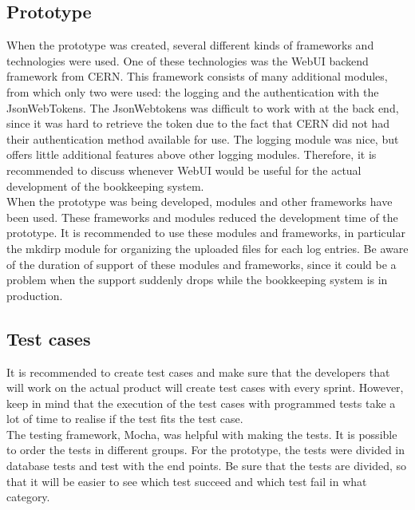 \documentclass[paper=a4, fontsize=11pt,twoside]{scrartcl}	%
\begin{document}
\subsection{Prototype}
When the prototype was created, several different kinds of frameworks and technologies were used. One of these technologies was the WebUI backend framework from CERN. This framework consists of many additional modules, from which only two were used: the logging and the authentication with the JsonWebTokens. The JsonWebtokens was difficult to work with at the back end, since it was hard to retrieve the token due to the fact that CERN did not had their authentication method available for use. The logging module was nice, but offers little additional features above other logging modules. Therefore, it is recommended to discuss whenever WebUI would be useful for the actual development of the bookkeeping system. \\
When the prototype was being developed, modules and other frameworks have been used. These frameworks and modules reduced the development time of the prototype. It is recommended to use these modules and frameworks, in particular the mkdirp module for organizing the uploaded files for each log entries. Be aware of the duration of support of these modules and frameworks, since it could be a problem when the support suddenly drops while the bookkeeping system is in production. \\


\subsection{Test cases}
It is recommended to create test cases and make sure that the developers that will work on the actual product will create test cases with every sprint. However, keep in mind that the execution of the test cases with programmed tests take a lot of time to realise if the test fits the test case. \\
The testing framework, Mocha, was helpful with making the tests. It is possible to order the tests in different groups. For the prototype, the tests were divided in database tests and test with the end points. Be sure that the tests are divided, so that it will be easier to see which test succeed and which test fail in what category.

\newpage
\end{document}
